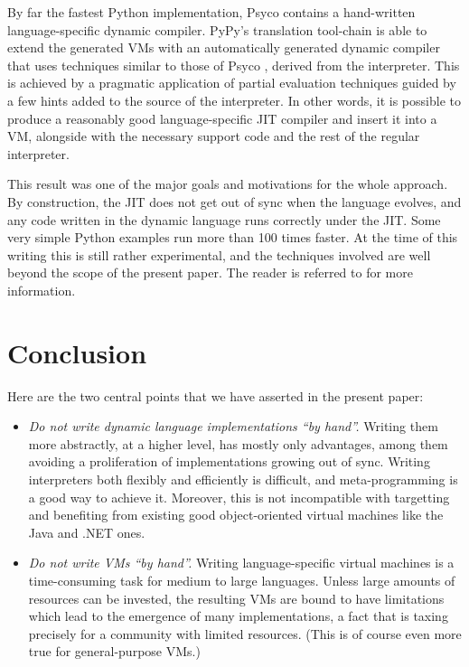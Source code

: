 \documentclass[utf8x]{llncs}
\begin{document}
By far the fastest Python implementation, Psyco \cite{psyco-software} contains a
hand-written language-specific dynamic compiler.  PyPy's translation
tool-chain is able to extend the generated VMs with an automatically
generated dynamic compiler that uses techniques similar to those of Psyco
\cite{Psyco-paper}, derived from the
interpreter.  This is achieved by a pragmatic application of partial
evaluation techniques guided by a few hints added to the source of the
interpreter.  In other words, it is possible to produce a reasonably
good language-specific JIT compiler and insert it into a VM, alongside
with the necessary support code and the rest of the regular interpreter.

This result was one of the major goals and motivations for the whole
approach.  By construction, the JIT does not get out of sync when the
language evolves, and any code written in the dynamic language runs
correctly under the JIT.  Some very simple Python examples run more than
100 times faster.  At the time of this writing this is still rather
experimental, and the techniques involved are well beyond the scope of
the present paper.  The reader is referred to \cite{D08.2} for more
information.


\section{Conclusion}

Here are the two central points that we have asserted in the present
paper:

\begin{itemize}
\item \emph{Do not write dynamic language implementations ``by hand''.}
Writing them more abstractly, at a higher level, has mostly only
advantages, among them avoiding a proliferation of implementations
growing out of sync.  Writing interpreters both flexibly and efficiently
is difficult, and meta-programming is a good way to achieve it.
Moreover, this is not incompatible with targetting and benefiting from
existing good object-oriented virtual machines like the Java and .NET
ones.

\item \emph{Do not write VMs ``by hand''.}
Writing language-specific virtual machines is a time-consuming task for
medium to large languages.  Unless large amounts of resources can be
invested, the resulting VMs are bound to have limitations which lead to
the emergence of many implementations, a fact that is taxing precisely
for a community with limited resources.  (This is of course even more
true for general-purpose VMs.)
\end{itemize}
\end{document}
